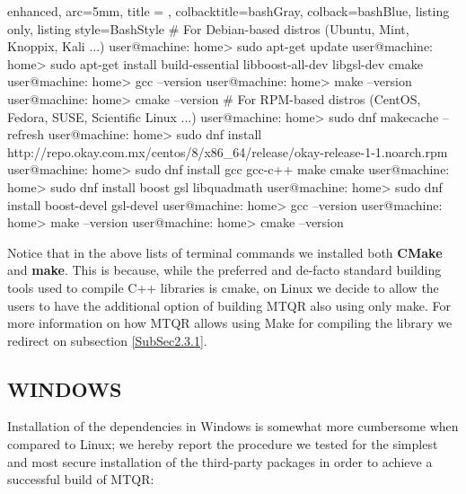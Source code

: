 \documentclass[a4paper, twosided]{book}
\begin{document}
\vspace{0.2cm}
\begin{tcblisting}{enhanced,
                   arc=5mm,
                   title = \color{black}{\large \ttfamily Installation of third-party libraries (Linux)},
                   colbacktitle=bashGray,
                   colback=bashBlue,
                   listing only,
                   listing style=BashStyle}
# For Debian-based distros (Ubuntu, Mint, Knoppix, Kali ...)
user@machine: home> sudo apt-get update
user@machine: home> sudo apt-get install build-essential libboost-all-dev libgsl-dev cmake
user@machine: home> gcc --version
user@machine: home> make --version
user@machine: home> cmake --version
# For RPM-based distros (CentOS, Fedora, SUSE, Scientific Linux ...)
user@machine: home> sudo dnf makecache --refresh
user@machine: home> sudo dnf install http://repo.okay.com.mx/centos/8/x86_64/release/okay-release-1-1.noarch.rpm
user@machine: home> sudo dnf install gcc gcc-c++ make cmake
user@machine: home> sudo dnf install boost gsl libquadmath
user@machine: home> sudo dnf install boost-devel gsl-devel
user@machine: home> gcc --version
user@machine: home> make --version
user@machine: home> cmake --version
\end{tcblisting}
\vspace{0.3cm}

\noindent
Notice that in the above lists of terminal commands we installed both \color{poliDarkBlue} \textbf{CMake} \color{black} and \color{poliDarkBlue} \textbf{make}\color{black}. This is because, while the preferred and de-facto standard building tools used to compile C++ libraries is \colorbox{poliGrayBlue}{cmake}, on Linux we decide to allow the users to have the additional option of building MTQR also using only \colorbox{poliGrayBlue}{make}. For more information on how MTQR allows using Make for compiling the library we redirect on subsection \ref{SubSec2.3.1}.

\subsection[Windows]{\changefont WINDOWS}\label{SubSec2.1.2}

Installation of the dependencies in Windows is somewhat more cumbersome when compared to Linux; we hereby report the procedure we tested for the simplest and most secure installation of the third-party packages in order to achieve a successful build of MTQR:
\end{document}
